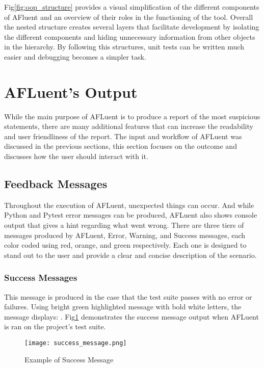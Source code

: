 Fig\ref{fig:oop_structure} provides a visual simplification of the different
components of AFluent and an overview of their roles in the functioning of the
tool. Overall the nested structure creates several layers that facilitate
development by isolating the different components and hiding unnecessary
information from other objects in the hierarchy. By following this structures,
unit tests can be written much easier and debugging becomes a simpler task.

\section{AFLuent's Output}
\label{sec:afluent_output}

While the main purpose of AFLuent is to produce a report of the most suspicious
statements, there are many additional features that can increase the readability
and user friendliness of the report. The input and workflow of AFLuent was
discussed in the previous sections, this section focuses on the outcome and
discusses how the user should interact with it.

\subsection{Feedback Messages}
\label{subsec:feedback_messages}

Throughout the execution of AFLuent, unexpected things can occur. And while
Python and Pytest error messages can be produced, AFLuent also shows console
output that gives a hint regarding what went wrong. There are three tiers of
messages produced by AFLuent, Error, Warning, and Success messages, each color
coded using red, orange, and green respectively. Each one is designed to stand
out to the user and provide a clear and concise description of the scenario.

\subsubsection{Success Messages}
\label{subsubsec:success_message}

This message is produced in the case that the test suite passes with no
error or failures. Using bright green highlighted message with bold white
letters, the message displays: . Fig\ref{fig:success_message} demonstrates the success message output
when AFLuent is ran on the project's test suite.

\begin{figure}[!htb]
	\begin{center}
		\texttt{[image: success\_message.png]}
		\caption{\label{fig:success_message} Example of Success Message}
	\end{center}
\end{figure}


